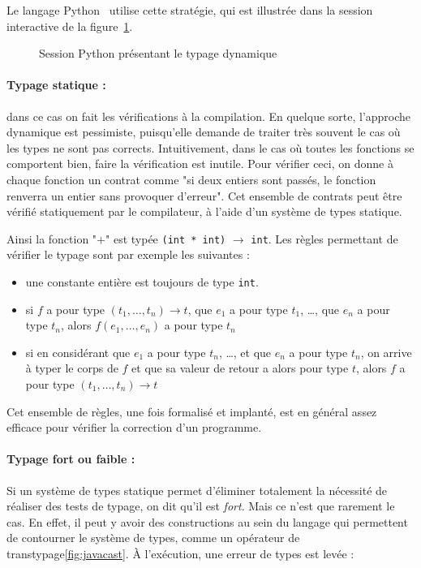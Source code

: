 Le langage Python~ utilise cette stratégie, qui est illustrée dans
la session interactive de la figure~\ref{fig:typage-dynamique}.

\begin{figure}
  \caption{Session Python présentant le typage dynamique}
  \label{fig:typage-dynamique}
\end{figure}

\paragraph{Typage statique :} dans ce cas on fait les vérifications à la
compilation. En quelque sorte, l'approche dynamique est pessimiste, puisqu'elle
demande de traiter très souvent le cas où les types ne sont pas corrects.
Intuitivement, dans le cas où toutes les fonctions se comportent bien, faire la
vérification est inutile. Pour vérifier ceci, on donne à chaque fonction un
contrat comme "si deux entiers sont passés, le fonction renverra un entier sans
provoquer d'erreur". Cet ensemble de contrats peut être vérifié statiquement par
le compilateur, à l'aide d'un système de types statique.

Ainsi la fonction "$+$" est typée \texttt{(int * int)} $→$ \texttt{int}. Les
règles permettant de vérifier le typage sont par exemple les suivantes :

\begin{itemize}
\item
  une constante entière est toujours de type \texttt{int}.
\item
  si $f$ a pour type $(t_1, …, t_n) → t$, que $e_1$ a pour type $t_1$,
  \ldots{}, que $e_n$ a pour type $t_n$, alors $f(e_1, …, e_n)$ a pour
  type $t_n$
\item
  si en considérant que $e_1$ a pour type $t_n$, …, et que $e_n$ a pour type
  $t_n$, on arrive à typer le corps de $f$ et que sa valeur de retour a alors
  pour type $t$,
  alors $f$ a pour type $(t_1, …, t_n) → t$
\end{itemize}

Cet ensemble de règles, une fois formalisé et implanté, est en général assez
efficace pour vérifier la correction d'un programme.

\paragraph{Typage fort ou faible :}

Si un système de types statique permet d'éliminer totalement la nécessité de
réaliser des tests de typage, on dit qu'il est \emph{fort}. Mais ce n'est que
rarement le cas. En effet, il peut y avoir des constructions au sein du langage
qui permettent de contourner le système de types, comme un opérateur de
transtypage\ref{fig:javacast}. À l'exécution, une erreur de types est levée :

